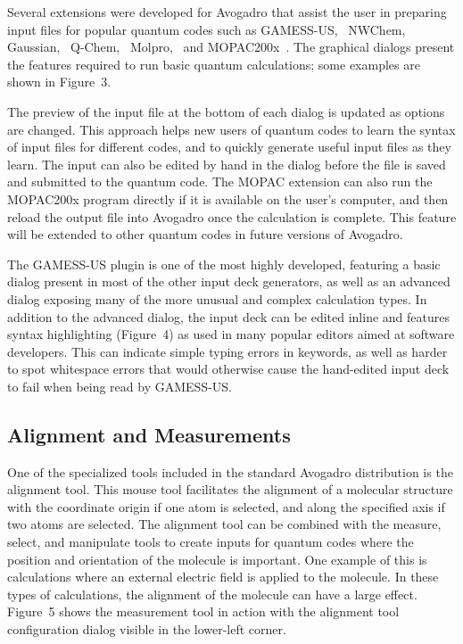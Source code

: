 \documentclass[10pt]{bmc_article}
\newenvironment{bmcformat}{\begin{raggedright}
  \baselineskip20pt\sloppy\setboolean{publ}{false}}{\end{raggedright}
  \baselineskip20pt\sloppy}
\begin{document}
\begin{bmcformat}
Several extensions were developed for Avogadro that assist the user in preparing
input files for popular quantum codes such as
GAMESS-US,~\cite{GAMESS-US} NWChem,~\cite{NWChem}
Gaussian,~\cite{g09} Q-Chem,~\cite{Q-Chem3} Molpro,~\cite{MOLPRO}
and MOPAC200x~\cite{MOPAC}. The graphical dialogs present the features
required to run basic quantum calculations; some examples are shown in
Figure~3.

The preview of the input file at the bottom of each dialog is updated as options
are changed. This approach helps new users of quantum codes to learn the syntax
of input files for different codes, and to quickly generate useful input files
as they learn. The input can also be edited by hand in the dialog before the file is saved
and submitted to the quantum code. The MOPAC extension can also run the
MOPAC200x
program directly if it is available on the user's computer, and then reload the
output file into Avogadro once the calculation is complete. This
feature will be extended to other quantum codes in future versions of Avogadro.

The GAMESS-US plugin is one of the most highly developed, featuring a basic dialog
present in most of the other input deck generators, as well as an advanced dialog
exposing many of the more unusual and complex calculation types. In addition to
the advanced dialog, the input deck can be edited inline and features syntax
highlighting (Figure~4) as used in many popular editors aimed at software developers. This
can indicate simple typing errors in keywords, as well as harder to spot whitespace
errors that would otherwise cause the hand-edited input deck to fail when being
read by GAMESS-US.

\subsection*{Alignment and Measurements}

One of the specialized tools included in the standard Avogadro distribution is
the alignment tool. This mouse tool facilitates the alignment of a molecular
structure with the coordinate origin if one atom is selected, and along the
specified axis if two atoms are selected. The alignment tool can be combined
with the measure, select, and manipulate tools to create inputs for
quantum codes where the position and orientation of the molecule is important.
One example of this is calculations where an external electric field is applied
to the molecule. In these types of calculations, the alignment of the molecule
can have a large effect. Figure~5 shows the measurement tool
in action with the alignment tool configuration dialog visible in the lower-left
corner.


\end{bmcformat}
\end{document}
